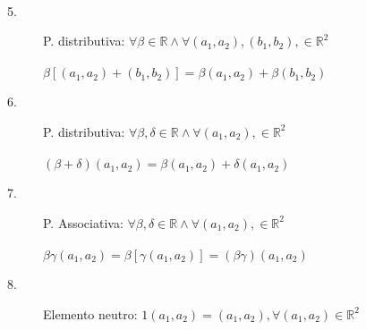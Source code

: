 \begin{nota}
  \phantom{}\\
  \begin{description}
    \item[5.] P. distributiva: $\forall \beta\in \mathbb{R} \wedge
      \forall (a_{1}, a_{2}),(b_{1}, b_{2}), \in \mathbb{R}^{2}$\\\\
      \phantom{texttexttextt}$\beta[(a_{1}, a_{2})+(b_{1},
      b_{2})]=\beta(a_{1}, a_{2})+\beta(b_{1}, b_{2})$\\
    \item[6.] P. distributiva: $\forall \beta,\delta\in \mathbb{R}
      \wedge \forall (a_{1}, a_{2}), \in \mathbb{R}^{2}$\\\\
      \phantom{texttexttextt}$(\beta+\delta)(a_{1},
      a_{2})=\beta(a_{1}, a_{2})+\delta(a_{1}, a_{2})$\\
    \item[7.] P. Associativa: $\forall \beta,\delta\in \mathbb{R}
      \wedge \forall (a_{1}, a_{2}), \in \mathbb{R}^{2}$\\\\
      \phantom{texttexttextt}$\beta\gamma(a_{1},
      a_{2})=\beta[\gamma(a_{1}, a_{2})]=(\beta\gamma)(a_{1}, a_{2})$\\
    \item[8.] Elemento neutro: $1(a_{1}, a_{2})=(a_{1}, a_{2}),
      \forall(a_{1}, a_{2})\in\mathbb{R}^{2}$
  \end{description}
\end{nota}

